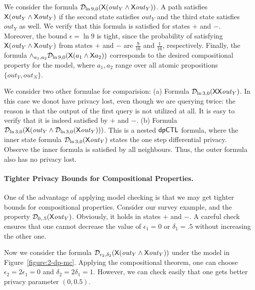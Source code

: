 We consider the formula $\mathcal{D}_{{\ln 9}, {0}} (\mathsf{X} (\mathit{out}_Y\wedge \mathsf{X} \mathit{out}_Y))$. A path satisfies $\mathsf{X} (\mathit{out}_Y\wedge \mathsf{X} \mathit{out}_Y)$ if the second state satisfies $\mathit{out}_Y$ and the third state satisfies $\mathit{out}_Y$ as well. We verify that this formula is satisfied for states $+$ and $-$. Moreover, the bound $\epsilon=\ln 9$ is tight, since the probability of satisfying $\mathsf{X} (\mathit{out}_Y\wedge \mathsf{X} \mathit{out}_Y)$ from states $+$ and $-$ are $\frac{9}{16}$ and $\frac{1}{16}$, respectively. Finally, the formula $\wedge_{a_1,a_2}\mathcal{D}_{{\ln 9}, {0}} (\mathsf{X} (a_1\wedge \mathsf{X} a_2))$ corresponds to the desired compositional property for the model, where $a_1,a_2$ range over all atomic propositions $\{\mathit{out}_Y, \mathit{out}_N\}$.

We consider two other formulae for comparision:
(a) Formula $\mathcal{D}_{{\ln 3}, {0}} (\mathsf{X} \mathsf{X} \mathit{out}_Y)$. In this case we donot have privacy lost, even though we are querying twice: the reason is that the output of the first query is not utilized at all. It is easy to verify that it is indeed satisfied by $+$ and $-$.
(b) Formula $\mathcal{D}_{{\ln 3}, {0}} (\mathsf{X} (\mathit{out}_Y\wedge \mathcal{D}_{{\ln 3}, {0}}(\mathsf{X} \mathit{out}_Y)))$. This is a nested $\textsf{dpCTL}$ formula, where the inner state formula $\mathcal{D}_{{\ln 3}, {0}}(\mathsf{X} \mathit{out}_Y)$ states the one step differential privacy. Observe the inner formula is satisfied by all neighbours. Thus, the outer formula also has no privacy lost.

\paragraph{Tighter Privacy Bounds for Compositional Properties.}
One of the advantage of applying model checking is that we may get tighter bounds for compositional properties. Consider our survey example, and the property $\mathcal{D}_{{0}, {.5}} (\mathsf{X} \mathit{out}_Y)$. Obviously, it holds in states $+$ and $-$. A careful check ensures that one cannot decrease the value of $\epsilon_1=0$ or $\delta_1=.5$ without increasing the other one.


Now we consider the formula $\mathcal{D}_{{\epsilon_2}, {\delta_2}} (\mathsf{X}
(\mathit{out}_Y\wedge \mathsf{X} \mathit{out}_Y))$ under the model in
Figure~\ref{figure:2-dp-mc}. Applying the
compositional theorem, one can choose $\epsilon_2=2\epsilon_1=0$ and
$\delta_2=2\delta_1=1$. However, we can check easily that one gets
better privacy parameter $(0,0.5)$.

